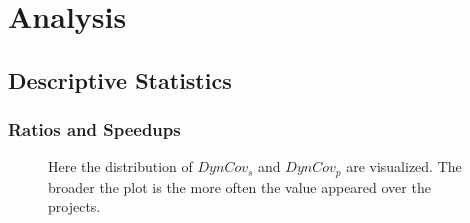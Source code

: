 \chapter{Analysis}
\section{Descriptive Statistics}
\subsection{Ratios and Speedups}
\begin{figure}[!h]
    \caption[Comparison of the distribution of \(DynCov_s\) and \(DynCov_p\)]{
        Here the distribution of \(DynCov_s\) and \(DynCov_p\) are visualized.
        The broader the plot is the more often the value appeared over the projects.
    }
    
\end{figure}
\begin{comment}
    \caption[Measured ratios and speedups]{
        Measured ratios and speedups.
        This table lists the ratio of the \scops -- this means the parts which can be optimized by Polly -- according to the execution time of the tests of the project.
        \draftnote{A \enquote{X} indicates that no data is available either because the run time tests of the project or the measured project itself is broken.}
    }
\end{comment}
